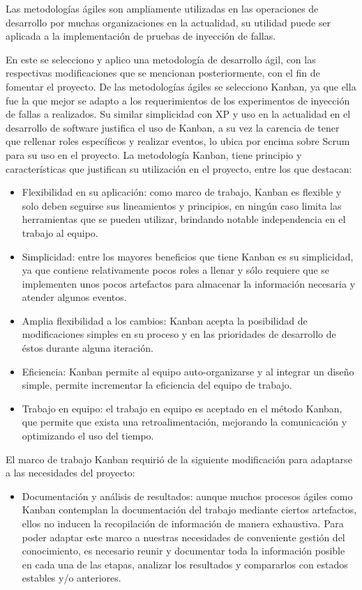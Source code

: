 \par Las metodologías ágiles son ampliamente utilizadas en las operaciones de desarrollo por muchas organizaciones en la actualidad, su utilidad puede ser aplicada a la implementación de pruebas de inyección de fallas.\\ %
\par En este se selecciono y aplico una metodología de desarrollo ágil, con las respectivas modificaciones que se mencionan posteriormente, con el fin de fomentar el proyecto. De las metodologías ágiles se selecciono Kanban, ya que ella fue la que mejor se adapto a los requerimientos de los experimentos de inyección de fallas a realizados. Su similar simplicidad con XP y uso en la actualidad en el desarrollo de software justifica el uso de Kanban, a su vez la carencia de tener que rellenar roles específicos y realizar eventos, lo ubica por encima sobre Scrum para su uso en el proyecto. La metodología Kanban, tiene principio y características  que justifican su utilización en el proyecto, entre los que destacan:
\begin{itemize}
    \item Flexibilidad en su aplicación: como marco de trabajo, Kanban es flexible y solo deben seguirse sus lineamientos y principios, en ningún caso limita las herramientas que se pueden utilizar, brindando notable independencia en el trabajo al equipo.
    \item Simplicidad: entre los mayores beneficios que tiene Kanban es su simplicidad, ya que contiene relativamente pocos roles a llenar y sólo requiere que se implementen unos pocos artefactos para almacenar la información necesaria y atender algunos eventos.
    \item Amplia flexibilidad a los cambios: Kanban acepta la posibilidad de modificaciones simples en su proceso y en las prioridades de desarrollo de éstos durante alguna iteración.
    \item Eficiencia: Kanban permite al equipo auto-organizarse y al integrar un diseño simple, permite incrementar la eficiencia del equipo de trabajo.
    \item Trabajo en equipo: el trabajo en equipo es aceptado en el método Kanban, que permite que exista una retroalimentación, mejorando la comunicación y optimizando el uso del tiempo.
\end{itemize} 
\par El marco de trabajo Kanban requirió de la siguiente modificación para adaptarse a las necesidades del proyecto:
\begin{itemize}
    \item Documentación y análisis de resultados: aunque muchos procesos ágiles como Kanban contemplan la documentación del trabajo mediante ciertos artefactos, ellos no inducen la recopilación de información de manera exhaustiva. Para poder adaptar este marco a nuestras necesidades de conveniente gestión del conocimiento, es necesario reunir y documentar toda la información posible en cada una de las etapas, analizar los resultados y compararlos con estados estables y/o anteriores. 
\end{itemize}
 
